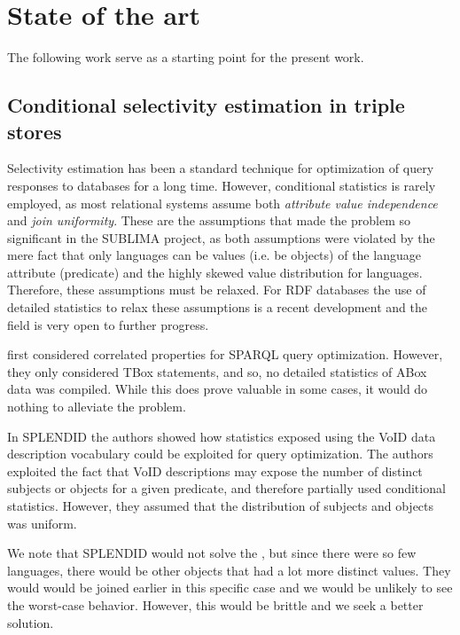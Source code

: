 
\section{State of the art}

The following work serve as a starting point for the present work.

\subsection{Conditional selectivity estimation in triple stores}

Selectivity estimation has been a standard technique for optimization
of query responses to databases for a long time. However, conditional
statistics is rarely employed, as most relational systems assume both
\emph{attribute value independence} and \emph{join
  uniformity}. These are the assumptions
that made the \langcase{} problem so significant in the SUBLIMA
project, as both assumptions were violated by the mere fact that only
languages can be values (i.e. be objects) of the language attribute
(predicate) and the highly skewed value distribution for
languages. Therefore, these assumptions must be relaxed. For RDF
databases the use of detailed statistics to relax these assumptions is
a recent development and the field is very open to further progress.

\cite{Lv:2009:SEC:1685170.1685590} first considered correlated
properties for SPARQL query optimization. However, they only
considered TBox statements, and so, no detailed statistics of ABox
data was compiled. While this does prove valuable in some cases, it
would do nothing to alleviate the \langcase{} problem.

In SPLENDID\cite{splendid} the authors showed how statistics exposed
using the VoID data description vocabulary\cite{void} could be
exploited for query optimization. The authors exploited the fact that
VoID descriptions may expose the number of distinct subjects or
objects for a given predicate, and therefore partially used
conditional statistics. However, they assumed that the distribution of
subjects and objects was uniform.

We note that SPLENDID would not solve the \langcase, but since there
were so few languages, there would be other objects that had a lot
more distinct values. They would would be joined earlier in this
specific case and we would be unlikely to see the worst-case
behavior. However, this would be brittle and we seek a better
solution.

